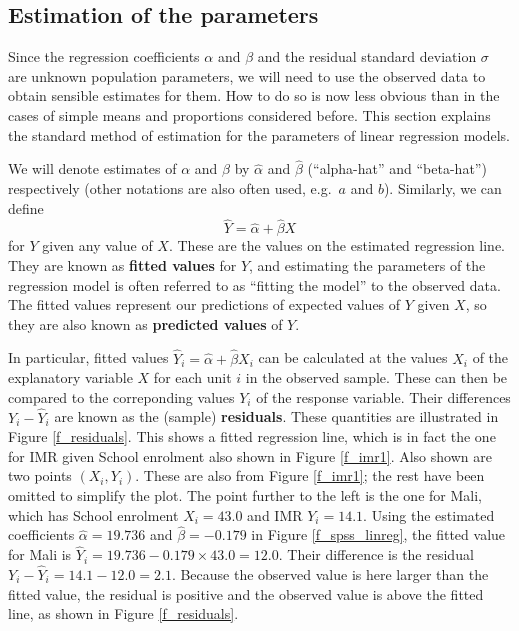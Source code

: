 \subsection{Estimation of the parameters}
\label{ss_regression_simple_est}

Since the regression coefficients $\alpha$ and $\beta$ and the residual
standard deviation $\sigma$ are unknown population parameters, we will
need to use the observed data to obtain sensible estimates for them. How
to do so is now less obvious than in the cases of simple means and
proportions considered before. This section explains the standard method
of estimation for the parameters of linear regression models.

We will denote estimates of $\alpha$ and $\beta$ by $\hat{\alpha}$ and
$\hat{\beta}$ (``alpha-hat'' and ``beta-hat'') respectively (other
notations are also often used, e.g.\ $a$ and $b$). Similarly, we can
define %
\[
\hat{Y}=\hat{\alpha}+\hat{\beta} X
\]
for $Y$ given any value of $X$. These are the values on the estimated
regression line. They are known as \textbf{fitted values} for $Y$, and
estimating the parameters of the regression model is often referred to
as ``fitting the model'' to the observed data. The fitted values
represent our predictions of expected values of $Y$ given $X$, so they
are also known as \textbf{predicted values} of $Y$.

In particular, fitted values $\hat{Y}_{i}=\hat{\alpha}+\hat{\beta}X_{i}$
can be calculated at the values $X_{i}$ of the explanatory variable
$X$ for each unit $i$ in the observed sample. These can then be compared
to the correponding values $Y_{i}$ of the response variable. Their
differences $Y_{i}-\hat{Y}_{i}$ are known as the (sample) \textbf{residuals}.
These quantities are illustrated in Figure \ref{f_residuals}. This shows
a fitted regression line, which is in fact the one for IMR
given School enrolment also shown in Figure \ref{f_imr1}. Also shown are
two points $(X_{i}, Y_{i})$. These are also from Figure
\ref{f_imr1}; the rest have been omitted to simplify the plot. The point
further to the left is the one for Mali, which has School enrolment
$X_{i}=43.0$ and IMR $Y_{i}=14.1$. Using the estimated
coefficients $\hat{\alpha}=19.736$ and $\hat{\beta}=-0.179$ in Figure
\ref{f_spss_linreg}, the fitted value for Mali is
$\hat{Y}_{i}=19.736-0.179\times 43.0=12.0$. Their difference is the
residual $Y_{i}-\hat{Y}_{i}=14.1-12.0=2.1$. Because the observed value
is here larger than the fitted value, the residual is positive and the
observed value is above the fitted line, as shown in Figure
\ref{f_residuals}.

